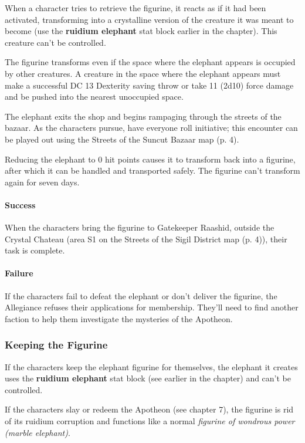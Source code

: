 \documentclass[letterpaper, 11pt, bg=full, twocolumn]{dndbook}
\begin{document}
When a character tries to retrieve the figurine, it reacts as if it had been activated, transforming into a crystalline version of the creature it was meant to become (use the \textbf{ruidium elephant} stat block earlier in the chapter). This creature can't be controlled.

The figurine transforms even if the space where the elephant appears is occupied by other creatures. A creature in the space where the elephant appears must make a successful DC 13 Dexterity saving throw or take 11 (2d10) force damage and be pushed into the nearest unoccupied space.

The elephant exits the shop and begins rampaging through the streets of the bazaar. As the characters pursue, have everyone roll initiative; this encounter can be played out using the Streets of the Suncut Bazaar map (p. 4).

Reducing the elephant to 0 hit points causes it to transform back into a figurine, after which it can be handled and transported safely. The figurine can't transform again for seven days.

\paragraph{Success}

When the characters bring the figurine to Gatekeeper Raashid, outside the Crystal Chateau (area S1 on the Streets of the Sigil District map (p. 4)), their task is complete.

\paragraph{Failure}

If the characters fail to defeat the elephant or don't deliver the figurine, the Allegiance refuses their applications for membership. They'll need to find another faction to help them investigate the mysteries of the Apotheon.

\subsubsection{Keeping the Figurine}

If the characters keep the elephant figurine for themselves, the elephant it creates uses the \textbf{ruidium elephant} stat block (see earlier in the chapter) and can't be controlled.

If the characters slay or redeem the Apotheon (see chapter 7), the figurine is rid of its ruidium corruption and functions like a normal \textit{figurine of wondrous power (marble elephant)}.
\end{document}

